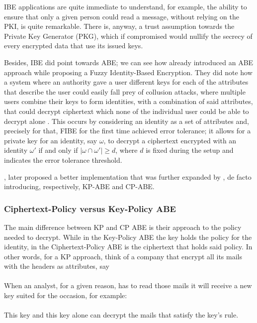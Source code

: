 IBE applications are quite immediate to understand, for example, the ability to ensure that only a given person could read a message, without relying on the PKI, is quite remarkable. There is, anyway, a trust assumption towards the Private Key Generator (PKG), which if compromised would nullify the secrecy of every encrypted data that use its issued keys.

Besides, IBE did point towards ABE; we can see how \citeauthor{sahai2005fuzzy} already introduced an ABE approach while proposing a Fuzzy Identity-Based Encryption. They did note how a system where an authority gave a user different keys for each of the attributes that describe the user could easily fall prey of collusion attacks, where multiple users combine their keys to form identities, with a combination of said attributes, that could decrypt ciphertext which none of the individual user could be able to decrypt alone \cite{sahai2005fuzzy}.
This occurs by considering an identity as a set of attributes and, precisely for that, FIBE for the first time achieved error tolerance; it allows for a private key for an identity, say $\omega$, to decrypt a ciphertext encrypted with an identity $\omega'$ if and only if $|\omega \cap \omega'| \geq d$, where $d$ is fixed during the setup and indicates the error tolerance threshold.

\citeauthor{goyal2006attribute}, later proposed a better implementation that was further expanded by \citeauthor{bethencourt2007ciphertext}, de facto introducing, respectively, KP-ABE and CP-ABE.
\subsubsection{Ciphertext-Policy versus Key-Policy ABE}\label{CPvsKP}
The main difference between KP and CP ABE is their approach to the policy needed to decrypt.
While in the Key-Policy ABE the key holds the policy for the identity, in the Ciphertext-Policy ABE is the ciphertext that holds said policy.
In other words, for a KP approach, think of a company that encrypt all its mails with the headers as attributes, say\\
\noindent
{}
\noindent\\
When an analyst, for a given reason, has to read those mails it will receive a new key suited for the occasion, for example:\\
\noindent
{}
\noindent\\
This key and this key alone can decrypt the mails that satisfy the key's rule.


